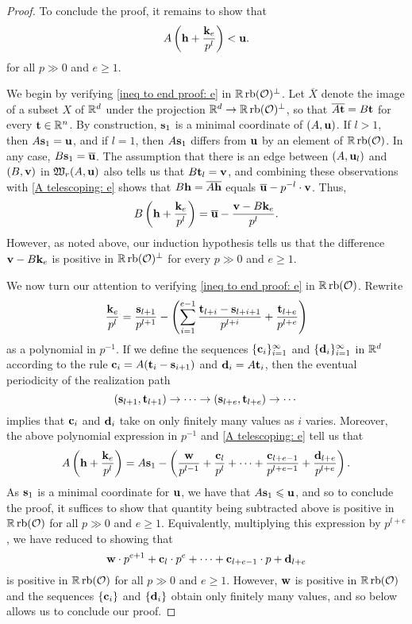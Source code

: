 \documentclass[11pt]{amsart}
\renewcommand{\!}[1]{{\color{red}\text{$\star$\,}#1\,$\star$}}
\newcommand{\ol}[1]{\overline{#1}}
\begin{document}
\begin{proof}
To conclude the proof, it remains to show that 
%
\begin{equation} 
\label{ineq to end proof: e}
A \left( \mathbf{h} + \frac{\mathbf{k}_e}{p^l} \right) < \mathbf{u}. 
\end{equation}
%
for all $p \gg 0$ and $e \geq 1$.

We begin by verifying \eqref{ineq to end proof: e} in $\mathbb{R} \operatorname{rb}(\mathcal{O})^{\perp}$.  Let $\ol{X}$ denote the image of a subset $X$ of $\mathbb{R}^d$ under the projection $\mathbb{R}^d \to \mathbb{R} \operatorname{rb}(\mathcal{O})^{\perp}$, so that $\ol{A \vv{t}} = B \vv{t}$ for every $\mathbf{t} \in \mathbb{R}^n$.    By construction, $\mathbf{s}_1$ is a minimal coordinate of $(A, \mathbf{u})$.  If $l > 1$, then $A \mathbf{s}_1 = \mathbf{u}$, and if $l =1$, then $A \mathbf{s}_1$ differs from $\mathbf{u}$ by an element of $\mathbb{R} \operatorname{rb}(\mathcal{O})$.  In any case, $B \vv{s}_1 = \ol{\vv{u}}$.   The assumption that there is an edge  between $(A, \mathbf{u}_l)$ and $(B, \mathbf{v})$ in $\mathfrak{W}_r(A, \mathbf{u})$ also tells us that $B \mathbf{t}_l = \mathbf{v}$, and combining these observations with \eqref{A telescoping: e} shows that
$B \vv{h} = \ol{A \vv{h}}$ equals $\ol{\vv{u}} - p^{-l} \cdot \vv{v}$.  Thus, 
\[  B \left( \vv{h} + \frac{\vv{k}_e}{p^l} \right) = \ol{\vv{u}} -  \frac{\vv{v} - B \vv{k}_e}{p^l}. \]
However, as noted above, our induction hypothesis tells us that the difference  $\mathbf{v} - B \mathbf{k}_e$ is positive in $\mathbb{R} \operatorname{rb}(\mathcal{O})^{\perp}$ for every $p \gg 0$ and $e \geq 1$.    

We now turn our attention to verifying \eqref{ineq to end proof: e} in $\mathbb{R} \operatorname{rb}(\mathcal{O})$.   Rewrite
\[ \frac{\mathbf{k}_e}{p^l} = \frac{\mathbf{s}_{l+1}}{p^{l+1}}- \left ( \sum_{i=1}^{e-1} \frac{ \mathbf{t}_{l+i} - \mathbf{s}_{l+i+1}}{p^{l+i}}  + \frac{ \mathbf{t}_{l+e}}{p^{l+e}} \right) \] as a polynomial in $p^{-1}$.  If we define the sequences $\{ \mathbf{c}_i \}_{i=1}^{\infty}$ and $\{ \mathbf{d}_i \}_{i=1}^{\infty}$ in $\mathbb{R}^d$ according to the rule $\mathbf{c}_i = A ( \mathbf{t}_i - \mathbf{s}_{i+1})$ and $\mathbf{d}_i = A \mathbf{t}_i$, then the eventual periodicity of the realization path 
\[ (\mathbf{s}_{l+1}, \mathbf{t}_{l+1}) \to \cdots \to (\mathbf{s}_{l+e}, \mathbf{t}_{l+e}) \to \cdots \] implies that $\mathbf{c}_i$ and $\mathbf{d}_i$ take on only finitely many values as $i$ varies.    Moreover, the above polynomial expression in $p^{-1}$ and \eqref{A telescoping: e} tell us that 
%
\[ A \left( \mathbf{h} + \frac{\mathbf{k}_e}{p^l} \right)  =  A \mathbf{s}_1 - \left( \frac{\mathbf{w}}{p^{l-1}} + \frac{ \mathbf{c}_{l}}{p^{l}} + \cdots +  \frac{ \mathbf{c}_{l+e-1}}{p^{l+e-1}} + \frac{\mathbf{d}_{l+e}}{p^{l+e}} \right).  \] 
%
As $\mathbf{s}_1$ is a minimal coordinate for $\mathbf{u}$, we have that $A \mathbf{s}_1 \leqslant \mathbf{u}$, and so to conclude the proof, it suffices to show that quantity being subtracted above is positive in $\mathbb{R} \operatorname{rb}(\mathcal{O})$ for all $p \gg 0$ and $e \geq 1$.  Equivalently, multiplying this expression by $p^{l+e}$, we have reduced to showing that 
\[ \mathbf{w} \cdot p^{e+1} + \mathbf{c}_l \cdot p^{e} + \cdots + \mathbf{c}_{l+e-1} \cdot p + \mathbf{d}_{l+e} \] is positive in $\mathbb{R} \operatorname{rb}(\mathcal{O})$ for all $p \gg 0$ and $e \geq 1$.  However, $\mathbf{w}$ is positive in $\mathbb{R} \operatorname{rb}(\mathcal{O})$ and the sequences $\{ \mathbf{c}_i \}$ and $\{ \mathbf{d}_i \}$ obtain only finitely many values, and so  below allows us to conclude our proof.

\end{proof}
\end{document}
